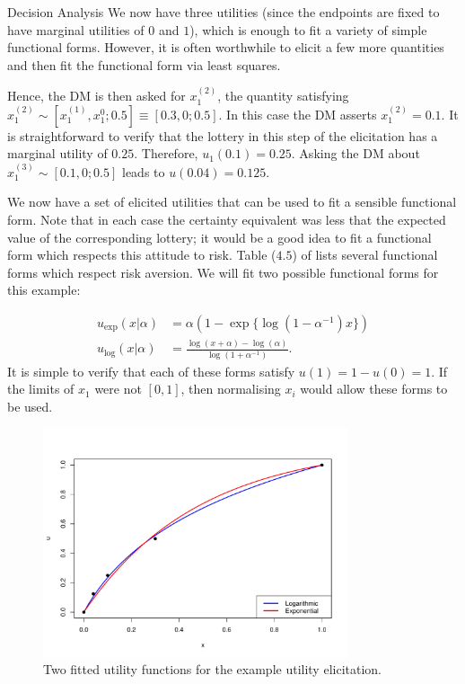\begin{chapter}{Decision Analysis \label{Ch:decision}}
 We now have three utilities (since the endpoints are fixed to have marginal utilities of $0$ and $1$), which is enough to fit a variety of simple functional forms. However, it is often worthwhile to elicit a few more quantities and then fit the functional form via least squares.

Hence, the DM is then asked for $x_1^{(2)}$, the quantity satisfying $x_1^{(2)} \sim [x_1^{(1)}, x_1^0 ; 0.5] \equiv [0.3,0; 0.5]$. In this case the DM asserts $x_1^{(2)} = 0.1$. It is straightforward to verify that the lottery in this step of the elicitation has a marginal utility of $0.25$. Therefore, $u_1(0.1) = 0.25$. Asking the DM about $x_1^{(3)} \sim [0.1, 0 ; 0.5]$ leads to $u(0.04) = 0.125$.

We now have a set of elicited utilities that can be used to fit a sensible functional form. Note that in each case the certainty equivalent was less that the expected value of the corresponding lottery; it would be a good idea to fit a functional form which respects this attitude to risk. Table ($4.5$) of \citet{Keeney1976} lists several functional forms which respect risk aversion. We will fit two possible functional forms for this example:

\begin{align}
	u_{\text{exp}}(x | \alpha) &= \alpha \left(  1 - \exp\{ \log(1 - \alpha^{-1})x \} \right) \\
	u_{\text{log}}(x | \alpha) & = \frac{\log(x + \alpha) - \log(\alpha)}{\log(1 + \alpha^{-1})}.
\end{align}
It is simple to verify that each of these forms satisfy $u(1) = 1 - u(0) = 1$. If the limits of $x_1$ were not $[0,1]$, then normalising $x_i$ would allow these forms to be used.

\begin{figure}
	\centering
	\includegraphics[width = 0.8\textwidth]{dec-fig/example-utility-fit.pdf}
	\caption{Two fitted utility functions for the example utility elicitation.}
	\label{Fig:example-elicitation}
\end{figure}


\end{chapter}
